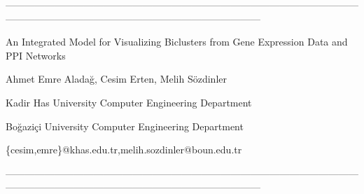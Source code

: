 \documentclass[a0,portrait]{a0poster}
\begin{document}
\begin{center}
------------------------------------------------------------------------------------------------------------------------------------------------------------------------------------------
\end{center}
\begin{center}
{\Large An Integrated Model for Visualizing Biclusters from Gene Expression Data and PPI Networks}
\end{center}
\vspace{0.1cm}
\begin{center}
{\Large Ahmet Emre Alada\u{g}, Cesim Erten, Melih S\"{o}zdinler}
\end{center}
\vspace{0.1cm}
\begin{center}
{\Large Kadir Has University Computer Engineering Department}
\end{center}
\vspace{0.1cm}
\begin{center}
{\Large Bo\u{g}azi\c{c}i University Computer Engineering Department} 
\end{center}
\vspace{0.1cm}
\begin{center}
{\Large \{cesim,emre\}@khas.edu.tr,melih.sozdinler@boun.edu.tr}
\end{center}
\begin{center}
\vspace{0.1cm}
\end{center}
\begin{center}
------------------------------------------------------------------------------------------------------------------------------------------------------------------------------------------
\end{center}
\vspace{1cm}
\end{document}
